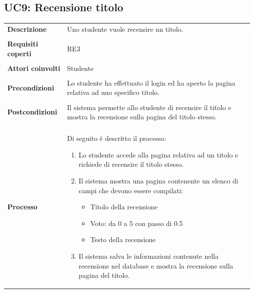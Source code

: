 \documentclass[10pt,a4paper]{report}
\begin{document}
	\subsection{UC9: Recensione titolo}
	\begin{tabular}{lp{}}
		\textbf{Descrizione}&Uno studente vuole recensire un titolo.\\
		\\
		\textbf{Requisiti coperti}&RE3\\
		\\
		\textbf{Attori coinvolti}&Studente\\
		\\
		\textbf{Precondizioni}&Lo studente ha effettuato il login ed ha aperto la pagina relativa ad uno specifico titolo.\\
		\\
		\textbf{Postcondizioni}&Il sistema permette allo studente di recensire il titolo e mostra la recensione sulla pagina del titolo stesso.\\
		\\
		\textbf{Processo}&Di seguito è descritto il processo:
		\begin{enumerate}
			\item Lo studente accede alla pagina relativa ad un titolo e richiede di recensire il titolo stesso.
			\item Il sistema mostra una pagina contenente un elenco di campi che devono essere compilati:
			\begin{itemize}
				\item Titolo della recensione
				\item Voto: da 0 a 5 con passo di 0.5
				\item Testo della recensione
			\end{itemize}
			\item Il sistema salva le informazioni contenute nella recensione nel database e mostra la recensione sulla pagina del titolo.
		\end{enumerate}
	\end{tabular}
\end{document}
